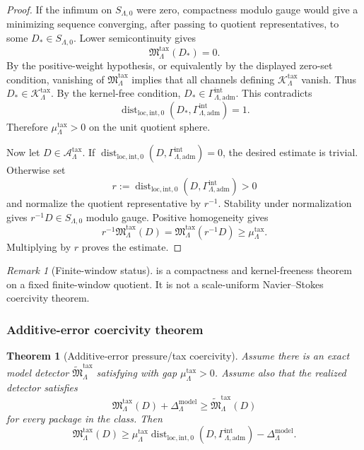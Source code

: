 \documentclass[11pt]{article}
\numberwithin{equation}{section}
\newtheorem{theorem}{Theorem}[section]
\theoremstyle{definition}
\theoremstyle{remark}
\newtheorem{remark}[remark]{Remark}
\newcommand{\loc}{\mathrm{loc}}
\newcommand{\intg}{\mathrm{int}}
\newcommand{\adm}{\mathrm{adm}}
\newcommand{\Dist}{\operatorname{dist}}
\newcommand{\Gammaadm}{\Gamma^{\intg}_{\Lambda,\adm}}
\begin{document}
\begin{proof}
If the infimum on \(S_{\Lambda,0}\) were zero, compactness modulo gauge would
give a minimizing sequence converging, after passing to quotient
representatives, to some \(D_*\in S_{\Lambda,0}\).  Lower
semicontinuity gives
\[
    \mathfrak M^{\mathrm{tax}}_\Lambda(D_*)=0.
\]
By the positive-weight hypothesis, or equivalently by the displayed zero-set
condition, vanishing of \(\mathfrak M^{\mathrm{tax}}_\Lambda\) implies that
all channels defining \(\mathcal K^{\mathrm{tax}}_\Lambda\) vanish.  Thus
\(D_*\in\mathcal K^{\mathrm{tax}}_\Lambda\).  By the kernel-free
condition, \(D_*\in\Gammaadm\).  This contradicts
\[
    \Dist_{\loc,\intg,0}(D_*,\Gammaadm)=1.
\]
Therefore \(\mu^{\mathrm{tax}}_\Lambda>0\) on the unit quotient sphere.

Now let \(D\in\mathcal A^{\mathrm{tax}}_\Lambda\).  If
\(\Dist_{\loc,\intg,0}(D,\Gammaadm)=0\), the desired estimate is trivial.
Otherwise set
\[
    r:=\Dist_{\loc,\intg,0}(D,\Gammaadm)>0
\]
and normalize the quotient representative by \(r^{-1}\).  Stability under
normalization gives \(r^{-1}D\in S_{\Lambda,0}\) modulo gauge.  Positive
homogeneity gives
\[
    r^{-1}\mathfrak M^{\mathrm{tax}}_\Lambda(D)
    =
    \mathfrak M^{\mathrm{tax}}_\Lambda(r^{-1}D)
    \ge
    \mu^{\mathrm{tax}}_\Lambda.
\]
Multiplying by \(r\) proves the estimate.
\end{proof}

\begin{remark}[Finite-window status]
 is a compactness and
kernel-freeness theorem on a fixed finite-window quotient.  It is not a
scale-uniform Navier--Stokes coercivity theorem.
\end{remark}

\subsubsection{Additive-error coercivity theorem}

\begin{theorem}[Additive-error pressure/tax coercivity]
\label{thm:additive-error-pressure-tax-coercivity}
Assume there is an exact model detector
\(\widetilde{\mathfrak M}^{\mathrm{tax}}_\Lambda\) satisfying
 with gap
\(\mu^{\mathrm{tax}}_\Lambda>0\).  Assume also that the realized detector
satisfies
\[
    \mathfrak M^{\mathrm{tax}}_\Lambda(D)
    +
    \Delta^{\mathrm{model}}_\Lambda
    \ge
    \widetilde{\mathfrak M}^{\mathrm{tax}}_\Lambda(D)
\]
for every package in the class.  Then
\[
    \mathfrak M^{\mathrm{tax}}_\Lambda(D)
    \ge
    \mu^{\mathrm{tax}}_\Lambda
    \Dist_{\loc,\intg,0}(D,\Gammaadm)
    -
    \Delta^{\mathrm{model}}_\Lambda.
\]
\end{theorem}
\end{document}
